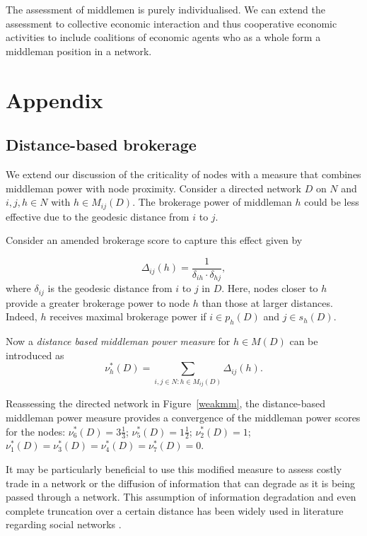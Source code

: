 \documentclass[11pt,fleqn]{article}
\begin{document}
The assessment of middlemen is purely individualised. We can extend the assessment to collective economic interaction and thus cooperative economic activities to include coalitions of economic agents who as a whole form a middleman position in a network.

\newpage

\section{Appendix}

\subsection{Distance-based brokerage}
\label{distanceBrokerage}

We extend our discussion of the criticality of nodes with a measure that combines middleman power with node proximity. Consider a directed network $D$ on $N$ and $i,j,h \in N$ with $h \in M_{ij}(D)$. The brokerage power of middleman $h$ could be less effective due to the geodesic distance from $i$ to $j$.

Consider an amended brokerage score to capture this effect given by

\begin{equation}
\Delta_{ij}(h) = \frac{1}{\delta_{ih} \cdot \delta_{hj}},
\end{equation}
where $\delta_{ij}$ is the geodesic distance from $i$ to $j$ in $D$. Here, nodes closer to $h$ provide a greater brokerage power to node $h$ than those at larger distances. Indeed, $h$ receives maximal brokerage power if $i \in p_{h}(D)$ and $j \in s_{h}(D)$.

Now a \emph{distance based middleman power measure} for $h \in M(D)$ can be introduced as
\begin{equation}
\nu^{\ast}_h (D) = \sum_{i,j \in N \colon h \in M_{ij} (D)} \Delta_{ij} (h) .
\end{equation}

Reassessing the directed network in Figure~\ref{weakmm}, the distance-based middleman power measure provides a convergence of the middleman power scores for the nodes: $\nu^{\ast}_{6}(D) = 3 \frac{1}{3}$; $\nu^{\ast}_{5}(D) = 1 \frac{1}{2}$; $\nu^{\ast}_{2}(D) = 1$; $\nu^{\ast}_{1}(D) = \nu^{\ast}_{3}(D) = \nu^{\ast}_{4}(D) = \nu^{\ast}_{7}(D) = 0$.

It may be particularly beneficial to use this modified measure to assess costly trade in a network or the diffusion of information that can degrade as it is being passed through a network. This assumption of information degradation and even complete truncation over a certain distance has been widely used in literature regarding social networks \citep{JacksonRogers2005}.
\end{document}
